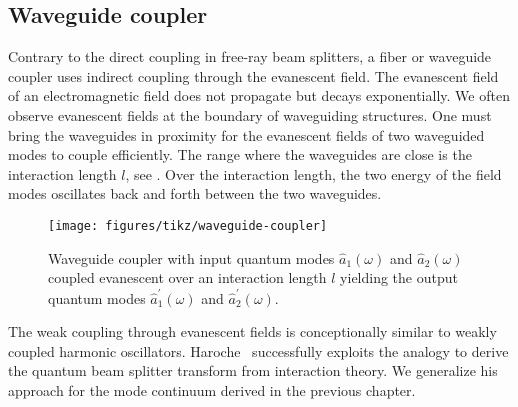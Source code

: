 \subsection{Waveguide coupler}

Contrary to the direct coupling in free-ray beam splitters, a fiber or waveguide coupler uses indirect coupling through the evanescent field.
The evanescent field of an electromagnetic field does not propagate but decays exponentially.
We often observe evanescent fields at the boundary of waveguiding structures.
One must bring the waveguides in proximity for the evanescent fields of two waveguided modes to couple efficiently.
The range where the waveguides are close is the interaction length $l$, see .
Over the interaction length, the two energy of the field modes oscillates back and forth between the two waveguides.
\begin{figure}[htb]
    \centering
    \texttt{[image: figures/tikz/waveguide-coupler]}
    \caption{Waveguide coupler with input quantum modes $\hat{a}_1(\omega)$ and $\hat{a}_2(\omega)$ coupled evanescent over an interaction length $l$ yielding the output quantum modes $\hat{a}_1^\prime(\omega)$ and $\hat{a}_2^\prime(\omega)$.}\label{fig:waveguide_coupler}
\end{figure}
The weak coupling through evanescent fields is conceptionally similar to weakly coupled harmonic oscillators.
Haroche~\cite[p.~131]{Haroche2006} successfully exploits the analogy to derive the quantum beam splitter transform from interaction theory.
We generalize his approach for the mode continuum derived in the previous chapter.

